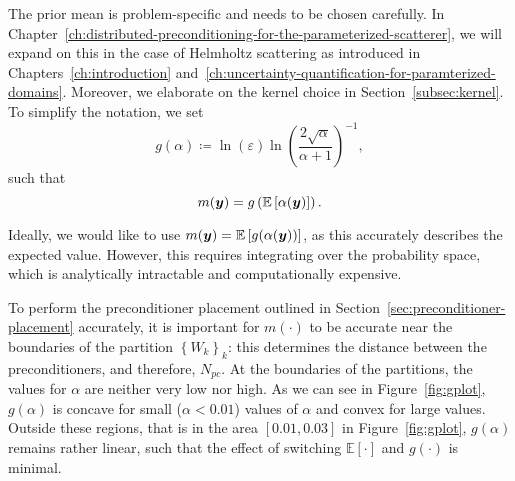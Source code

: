 The prior mean is problem-specific and needs to be chosen carefully.
In Chapter~\ref{ch:distributed-preconditioning-for-the-parameterized-scatterer}, we will expand on this in the case of Helmholtz scattering as introduced in Chapters~\ref{ch:introduction} and~\ref{ch:uncertainty-quantification-for-paramterized-domains}.
Moreover, we elaborate on the kernel choice in Section~\ref{subsec:kernel}.
To simplify the notation, we set
\begin{equation*}
    g(\alpha) \coloneqq \ln(\varepsilon)\ln\left(\frac{2\sqrt {\alpha}}{\alpha + 1}\right)^{-1},
\end{equation*}
such that
\begin{equation}
    m({\bm{y}}) = g\left(\mathbb{E}\left[ \alpha({\bm{y}}) \right]\right)\label{eq:m_estimate}.
\end{equation}
\begin{remark}
    Ideally, we would like to use $m({\bm{y}}) = \mathbb{E}\left[g( \alpha({\bm{y}})) \right]$, as this accurately describes the expected value.
    However, this requires integrating over the probability space, which is analytically intractable and computationally expensive.

    To perform the preconditioner placement outlined in Section~\ref{sec:preconditioner-placement} accurately, it is important for $m(\cdot)$ to be accurate near the boundaries of the partition $\left\{ W_k \right\}_{k}$: this determines the distance between the preconditioners, and therefore, $N_{pc}$.
    At the boundaries of the partitions, the values for $\alpha$ are neither very low nor high.
    As we can see in Figure~\ref{fig:gplot}, $g(\alpha)$ is concave for small ($\alpha < 0.01$) values of $\alpha$ and convex for large values.
    Outside these regions, that is in the area $[0.01, 0.03]$ in Figure~\ref{fig:gplot}, $g(\alpha)$ remains rather linear, such that the effect of switching $\mathbb{E}\left[ \cdot \right]$ and $g(\cdot)$ is minimal.
\end{remark}

